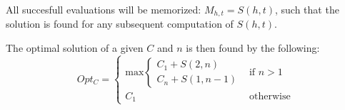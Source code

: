 All succesfull evaluations will be memorized: $M_{h,t} = S(h,t)$, such that the solution is found for any subsequent computation of $S(h,t)$. 

The optimal solution of a given $C$ and $n$ is then found by the following:
$$ Opt_C = \begin{cases}
    \text{max}\begin{cases}
        C_1 + S(2,n) \\
        C_n + S(1,n-1)
    \end{cases} & \text{if $n > 1$} \\
    C_1 & \text{otherwise}
\end{cases} $$
